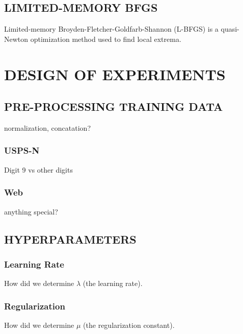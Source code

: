 \subsection{LIMITED-MEMORY BFGS}
Limited-memory Broyden-Fletcher-Goldfarb-Shannon (L-BFGS) is a quasi-Newton
optimization method used to find local extrema.



\section{DESIGN OF EXPERIMENTS}
\label{sec:experiments}

\subsection{PRE-PROCESSING TRAINING DATA}
normalization, concatation?

\subsubsection{USPS-N}
Digit 9 vs other digits

\subsubsection{Web}
anything special?



\subsection{HYPERPARAMETERS}

\subsubsection{Learning Rate}
How did we determine $\lambda$ (the learning rate).

\subsubsection{Regularization}
How did we determine $\mu$ (the regularization constant).




